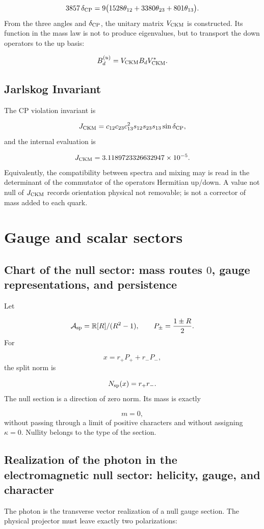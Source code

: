 \[
 3857\,\delta_{\rm CP}
 =9\bigl(
 1528\theta_{12}
 +3380\theta_{23}
 +801\theta_{13}
 \bigr).
\]
From the three angles and \(\delta_{\rm CP}\), the unitary matrix \(V_{\rm CKM}\) is constructed. Its function in the mass law is not to produce eigenvalues, but to transport the down operators to the up basis:

\[
 B_d^{(u)}=V_{\rm CKM}B_dV_{\rm CKM}^*.
\]
\subsection{Jarlskog Invariant}
The CP violation invariant is

\[
 J_{\rm CKM}
 =c_{12}c_{23}c_{13}^2
 s_{12}s_{23}s_{13}\sin\delta_{\rm CP},
\]
and the internal evaluation is

\[
 J_{\rm CKM}
 =3.1189723326632947\times10^{-5}.
\]
Equivalently, the compatibility between spectra and mixing may is read in the determinant of the commutator of the operators Hermitian up/down. A value not null of \(J_{\rm CKM}\) records orientation physical not removable; is not a corrector of mass added to each quark.

\section{Gauge and scalar sectors}
\subsection{Chart of the null sector: mass routes \(0\), gauge representations, and persistence}
Let

\[
 \mathcal A_{\rm sp}=\mathbb R[R]/(R^2-1),
 \qquad
 P_\pm=\frac{1\pm R}{2}.
\]
For

\[
 x=r_+P_++r_-P_-,
\]
the split norm is

\[
 N_{\rm sp}(x)=r_+r_-.
\]
The null section is a direction of zero norm. Its mass is exactly

\[
 m=0,
\]
without passing through a limit of positive characters and without assigning \(\kappa=0\). Nullity belongs to the type of the section.

\subsection{Realization of the photon in the electromagnetic null sector: helicity, gauge, and character}
The photon is the transverse vector realization of a null gauge section. The physical projector must leave exactly two polarizations:

